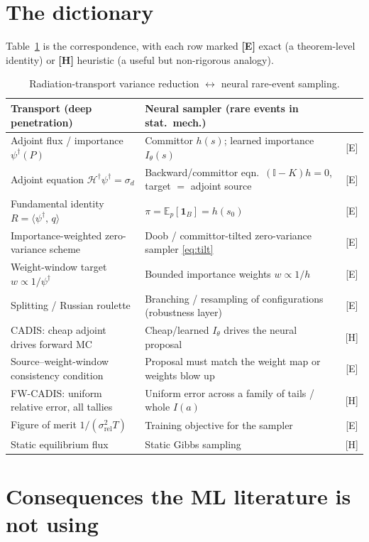 \documentclass[11pt]{article}
\newcommand{\dg}{^{\dagger}}
\newcommand{\ip}[2]{\langle #1,\,#2\rangle}
\newcommand{\E}{\mathbb{E}}
\begin{document}
\section{The dictionary}
Table~\ref{tab:dict} is the correspondence, with each row marked \textbf{[E]} exact
(a theorem-level identity) or \textbf{[H]} heuristic (a useful but non-rigorous analogy).

\begin{table}[h]
\centering\small
\caption{Radiation-transport variance reduction $\leftrightarrow$ neural rare-event sampling.}
\label{tab:dict}
\renewcommand{\arraystretch}{1.25}
\begin{tabular}{@{}p{4.9cm}p{6.4cm}c@{}}
\toprule
\textbf{Transport (deep penetration)} & \textbf{Neural sampler (rare events in stat.\ mech.)} & \\
\midrule
Adjoint flux / importance $\psi\dg(P)$ & Committor $h(s)$; learned importance $I_\theta(s)$ & [E]\\
Adjoint equation $\mathcal H\dg\psi\dg=\sigma_d$ & Backward/committor eqn.\ $(\mathbb I-K)h=0$, target $=$ adjoint source & [E]\\
Fundamental identity $R=\ip{\psi\dg}{q}$ & $\pi=\E_{p}[\mathbf 1_B]=h(s_0)$ & [E]\\
Importance-weighted zero-variance scheme & Doob / committor-tilted zero-variance sampler \eqref{eq:tilt} & [E]\\
Weight-window target $w\propto1/\psi\dg$ & Bounded importance weights $w\propto1/h$ & [E]\\
Splitting / Russian roulette & Branching / resampling of configurations (robustness layer) & [E]\\
CADIS: cheap adjoint drives forward MC & Cheap/learned $I_\theta$ drives the neural proposal & [H]\\
Source--weight-window consistency condition & Proposal must match the weight map or weights blow up & [E]\\
FW-CADIS: uniform relative error, all tallies & Uniform error across a family of tails / whole $I(a)$ & [H]\\
Figure of merit $1/(\sigma_{\mathrm{rel}}^2T)$ & Training objective for the sampler & [E]\\
Static equilibrium flux & Static Gibbs sampling & [H]\\
\bottomrule
\end{tabular}
\end{table}

\section{Consequences the ML literature is not using}
\end{document}
